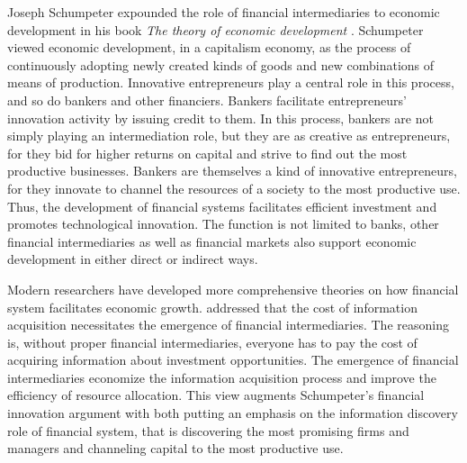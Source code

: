 \documentclass[AER]{AEA}
\begin{document}
Joseph Schumpeter expounded the role of financial intermediaries to economic
development in his book \textit{The theory of economic development}
\citep{schumpeter1934}. 
Schumpeter viewed economic development, in a capitalism economy, as the
process of continuously adopting newly created kinds of goods and new combinations
of means of production. Innovative entrepreneurs play a central role in this
process, and so do bankers and other financiers. Bankers facilitate
entrepreneurs' innovation activity by issuing credit to them. In this process,
bankers are not simply playing an intermediation role, but they are as creative as
entrepreneurs, for they bid for higher returns on capital and strive to find out
the most productive businesses. Bankers are themselves a kind of
innovative entrepreneurs, for they innovate to channel the resources of a
society to the most productive use. %
Thus, the development of financial systems facilitates efficient investment and
promotes technological innovation. The function is not limited to banks, other
financial intermediaries as well as financial markets also support economic
development in either direct or indirect ways.

Modern researchers have developed more comprehensive theories on how financial
system facilitates economic growth. \cite{boyd1986} addressed that the cost of
information acquisition necessitates the emergence of financial intermediaries.
The reasoning is, without proper financial intermediaries, everyone has to pay
the cost of acquiring information about investment opportunities.  
The emergence of financial intermediaries economize the information acquisition
process and improve the efficiency of resource allocation. This view
augments Schumpeter's financial innovation argument with both putting 
an emphasis on the information discovery role of financial system, that is
discovering the most promising firms and managers and channeling capital to the
most productive use. 
\end{document}

